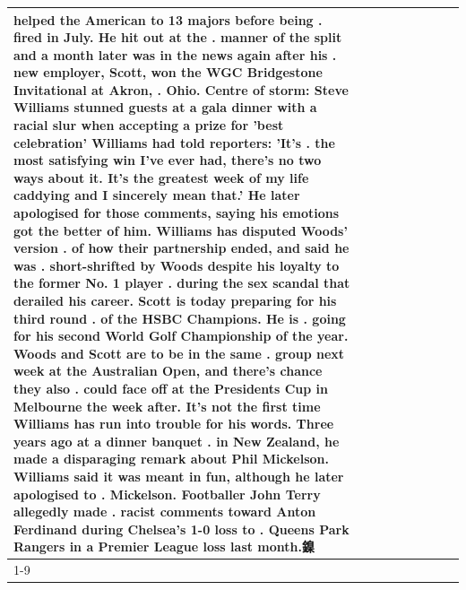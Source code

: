 \begin{table}[H]
\begin{tabular}{lllrlllll}
helped the American to 13 majors before being . fired in July. He hit out at the . manner of the split and a month later was in the news again after his . new employer, Scott, won the WGC Bridgestone Invitational at Akron, . Ohio. Centre of storm: Steve Williams stunned guests at a gala dinner with a racial slur when accepting a prize for 'best celebration' Williams had told reporters: 'It's . the most satisfying win I've ever had, there's no two ways about it. It's the greatest week of my life caddying and I sincerely mean that.' He later apologised for those comments, saying his emotions got the better of him. Williams has disputed Woods' version . of how their partnership ended, and said he was . short-shrifted by Woods despite his loyalty to the former No. 1 player . during the sex scandal that derailed his career. Scott is today preparing for his third round . of the HSBC Champions. He is . going for his second World Golf Championship of the year. Woods and Scott are to be in the same . group next week at the Australian Open, and there's chance they also . could face off at the Presidents Cup in Melbourne the week after. It's not the first time Williams has run into trouble for his words. Three years ago at a dinner banquet . in New Zealand, he made a disparaging remark about Phil Mickelson. Williams said it was meant in fun, although he later apologised to . Mickelson. Footballer John Terry allegedly made . racist comments toward Anton Ferdinand during Chelsea's 1-0 loss to . Queens Park Rangers in a Premier League loss last month.鎳 \\
\cline{1-9}

\end{tabular}
\end{table}
